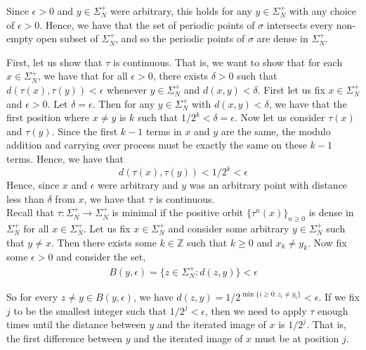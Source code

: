 \documentclass[12pt]{article}
\newenvironment{problem}[2][Problem]{\begin{trivlist}
\item[\hskip \labelsep {\bfseries #1}\hskip \labelsep {\bfseries #2.}]}{\end{trivlist}}
\begin{document}
Since $\epsilon > 0$ and $y \in \Sigma_N^+$ were arbitrary, this holds for any $y \in \Sigma_N^+$ with any choice of $\epsilon > 0$. Hence, we have that the set of periodic points of $\sigma$ intersects every non-empty open subset of $\Sigma_N^+$, and so the periodic points of $\sigma$ are dense in $\Sigma_N^+$.\\


\begin{problem}{3}
\end{problem}

First, let us show that $\tau$ is continuous. That is, we want to show that for each $x \in \Sigma_N^+$, we have that for all $\epsilon > 0$, there exists $\delta > 0$ such that $d(\tau(x), \tau(y)) < \epsilon$ whenever $y \in \Sigma_N^+$ and $d(x, y) < \delta$. First let us fix $x \in \Sigma_N^+$ and $\epsilon > 0$. Let $\delta = \epsilon$. Then for any $y \in \Sigma_N^+$ with $d(x, y) < \delta$, we have that the first position where $x \neq y$ is $k$ such that $1/2^k < \delta = \epsilon$. Now let us consider $\tau(x)$ and $\tau(y)$. Since the first $k-1$ terms in $x$ and $y$ are the same, the modulo addition and carrying over process must be exactly the same on these $k-1$ terms. Hence, we have that $$d(\tau(x), \tau(y)) < 1/2^k < \epsilon$$ Hence, since $x$ and $\epsilon$ were arbitrary and $y$ was an arbitrary point with distance less than $\delta$ from $x$, we have that $\tau$ is continuous.\\

Recall that $\tau: \Sigma_N^+ \to \Sigma_N^+$ is minimal if the positive orbit $\{\tau^n(x)\}_{n \geq 0}$ is dense in $\Sigma_N^+$ for all $x \in \Sigma_N^+$. Let us fix $x \in \Sigma_N^+$ and consider some arbitrary $y \in \Sigma_N^+$ such that $y \neq x$. Then there exists some $k \in \mathbb{Z}$ such that $k \geq 0$ and $x_k \neq y_k$. Now fix some $\epsilon > 0$ and consider the set,
\begin{align*}
B(y, \epsilon) = \{z \in \Sigma_N^+: d(z, y)\} < \epsilon
\end{align*}

So for every $z \neq y \in B(y, \epsilon)$, we have $d(z, y) = 1/2^{\min \{i \geq 0: z_i \neq y_i\}} < \epsilon$. If we fix $j$ to be the smallest integer such that $1/2^j < \epsilon$, then we need to apply $\tau$ enough times until the distance between $y$ and the iterated image of $x$ is $1/2^j$. That is, the first difference between $y$ and the iterated image of $x$ must be at position $j$.\\
\end{document}
